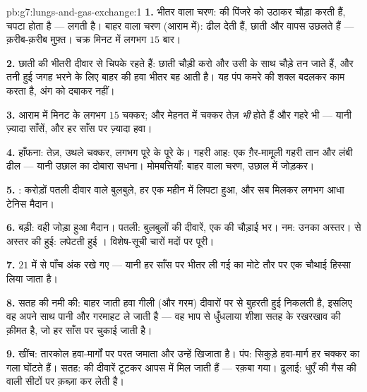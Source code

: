 \begin{solution}{pb:g7:lungs-and-gas-exchange:1}
\textbf{1.} भीतर वाला चरण:  की  पिंजरे को उठाकर चौड़ा
करती हैं,  चपटा होता है ---  लगती है। बाहर वाला चरण
(आराम में):  ढील देती हैं, छाती और  वापस उछलते हैं ---
क़रीब-क़रीब मुफ़्त। चक्र मिनट में लगभग $15$ बार।

\textbf{2.}  छाती की भीतरी दीवार से चिपके रहते हैं: छाती चौड़ी
करो और  उसी के साथ चौड़े तन जाते हैं, और तनी हुई जगह भरने के लिए
बाहर की हवा भीतर बह आती है। यह पंप कमरे की शक्ल बदलकर काम करता है, अंग
को दबाकर नहीं।

\textbf{3.} आराम में मिनट के लगभग $15$ चक्कर; और मेहनत में चक्कर तेज़
\emph{भी} होते हैं और गहरे भी --- यानी ज़्यादा साँसें, और हर साँस पर
ज़्यादा हवा।

\textbf{4.} हाँफना: तेज़, उथले चक्कर, लगभग पूरे के पूरे  के। गहरी
आह: एक ग़ैर-मामूली गहरी तान और लंबी ढील --- यानी उछाल का दोबारा सधना।
मोमबत्तियाँ: बाहर वाला चरण, उछाल में  जोड़कर।

\textbf{5.} : करोड़ों पतली दीवार वाले बुलबुले, हर एक महीन
 में लिपटा हुआ, और सब मिलकर लगभग आधा टेनिस मैदान।

\textbf{6.} बड़ी: वही जोड़ा हुआ मैदान। पतली: बुलबुलों की दीवारें, एक
 की चौड़ाई भर। नम: उनका अस्तर।  से अस्तर की हुई: लपेटती हुई
। विशेष-सूची चारों मदों पर पूरी।

\textbf{7.} $21$ में से पाँच अंक रखे गए --- यानी हर साँस पर भीतर ली गई
 का मोटे तौर पर एक चौथाई हिस्सा लिया जाता है।

\textbf{8.} सतह की नमी की: बाहर जाती हवा गीली (और गरम) दीवारों पर से
बुहरती हुई निकलती है, इसलिए वह अपने साथ पानी और गरमाहट ले जाती है ---
वह भाप से धुँधलाया शीशा सतह के रखरखाव की क़ीमत है, जो हर साँस पर चुकाई
जाती है।

\textbf{9.} खींच: तारकोल हवा-मार्गों पर परत जमाता और उन्हें खिजाता है।
पंप: सिकुड़े हवा-मार्ग हर चक्कर का गला घोंटते हैं। सतह:  की
दीवारें टूटकर आपस में मिल जाती हैं --- रक़बा गया। ढुलाई: धुएँ की गैस
 की  वाली सीटों पर क़ब्ज़ा कर लेती है।


\end{solution}
